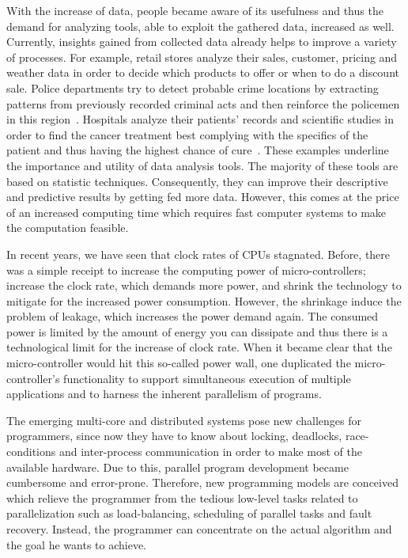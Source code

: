 \documentclass{dima}
\begin{document}
With the increase of data, people became aware of its usefulness and thus the demand for analyzing tools, able to exploit the gathered data, increased as well.
Currently, insights gained from collected data already helps to improve a variety of processes.
For example, retail stores analyze their sales, customer, pricing and weather data in order to decide which products to offer or  when to do a discount sale. 
Police departments try to detect probable crime locations by extracting patterns from previously recorded criminal acts and then  reinforce the policemen in  this region~\cite{lohr:yt2012a}. 
Hospitals analyze their patients' records and scientific studies in order to find the cancer treatment best complying with the  specifics of the patient and thus having the highest chance of cure~\cite{mskcc:2013a}. 
These examples underline the importance and utility of data analysis tools. 
The majority of these tools are based on statistic techniques. 
Consequently, they can improve their descriptive and predictive results by getting fed more data.
However, this comes at the price of an increased computing time which requires fast computer systems to make the computation feasible.

In recent years, we have seen that clock rates of CPUs stagnated.
Before, there was a simple receipt to increase the computing power of micro-controllers; increase the clock rate, which demands more power, and shrink the technology to mitigate for the increased power consumption.
However, the shrinkage induce the problem of leakage, which increases the power demand again.
The consumed power is limited by the amount of energy you can dissipate and thus there is a technological limit for the increase of clock rate.
When it became clear that the micro-controller would hit this so-called power wall, one duplicated the micro-controller's functionality to support simultaneous execution of multiple applications and to harness the inherent parallelism of programs.

The emerging multi-core and distributed systems pose new challenges for programmers, since now they have to know about locking, deadlocks, race-conditions and inter-process communication in order to make most of the available hardware.
Due to this, parallel program development became cumbersome and error-prone.
Therefore, new programming models are conceived which relieve the programmer from the tedious low-level tasks related to parallelization such as load-balancing, scheduling of parallel tasks and fault recovery.
Instead, the programmer can concentrate on the actual algorithm and the goal he wants to achieve.
\end{document}
